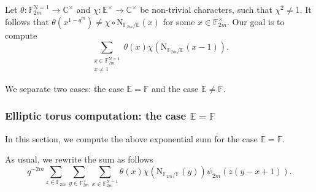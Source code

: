 \documentclass[12pt, reqno]{amsart}
\theoremstyle{definition}
\theoremstyle{definition}
\theoremstyle{definition}
\newcommand{\cComplex}{\mathbb{C}}
\newcommand{\multiplicativegroup}[1]{#1^{\times}}
\newcommand{\fieldCharacter}{\psi}
\newcommand{\aFieldNorm}{\mathrm{N}}
\newcommand{\finiteField}{\mathbb{F}}
\newcommand{\quadraticExtension}{\mathbb{E}}
\newcommand{\finiteFieldExtension}[1]{\finiteField_{#1}}
\newcommand{\NormOneGroup}[1]{\finiteFieldExtension{#1}^{\aFieldNorm = 1}}
\begin{document}
Let $\theta \colon \NormOneGroup{2m} \to \multiplicativegroup{\cComplex}$ and $\chi \colon \multiplicativegroup{\quadraticExtension} \to \multiplicativegroup{\cComplex}$ be non-trivial characters, such that $\chi^2 \ne 1$. It follows that $\theta\left(x^{1-q^m}\right) \ne \chi \circ \aFieldNorm_{\finiteFieldExtension{2m} \slash \quadraticExtension}\left(x\right)$ for some $x \in \multiplicativegroup{\finiteFieldExtension{2m}}$. Our goal is to compute $$\sum_{\substack{x \in \NormOneGroup{2m}\\
		x \ne 1}} \theta \left(x\right) \chi\left(\aFieldNorm_{\finiteFieldExtension{2m} \slash \quadraticExtension}\left(x - 1\right)\right).$$

We separate two cases: the case $\quadraticExtension = \finiteField$ and the case $\quadraticExtension \ne \finiteField$.

\subsubsection{Elliptic torus computation: the case $\quadraticExtension = \finiteField$}
In this section, we compute the above exponential sum for the case $\quadraticExtension = \finiteField$.

As usual, we rewrite the sum as follows
$$q^{-2m} \sum_{z \in \finiteFieldExtension{2m}} \sum_{y \in \multiplicativegroup{\finiteFieldExtension{2m}}} \sum_{x \in \NormOneGroup{2m}} \theta \left(x\right) \chi\left(\aFieldNorm_{\finiteFieldExtension{2m} \slash \finiteField}\left(y\right)\right) \fieldCharacter_{2m}\left(z\left(y-x+1\right)\right).$$
\end{document}
